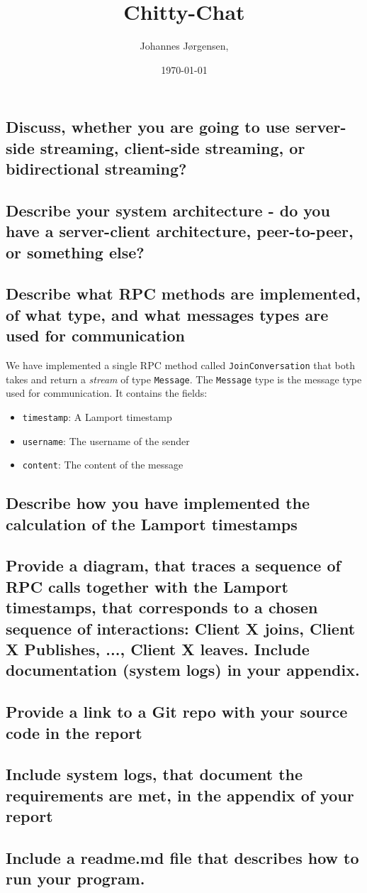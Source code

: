\documentclass[a4paper,11pt]{article}
\title{Chitty-Chat}
\author{Johannes Jørgensen,}
\date{\today}
\begin{document}
 

\maketitle

\subsection*{Discuss, whether you are going to use server-side streaming, client-side streaming, or bidirectional streaming?}

\subsection*{Describe your system architecture - do you have a server-client architecture, peer-to-peer, or something else?}
\subsection*{Describe what  RPC methods are implemented, of what type, and what messages types are used for communication}
We have implemented a single RPC method called \verb|JoinConversation| that both takes and return a \textit{stream} of type \verb|Message|.
The \verb|Message| type is the message type used for communication. It contains the fields:
\begin{itemize}
    \item \verb|timestamp|: A Lamport timestamp
    \item \verb|username|: The username of the sender
    \item \verb|content|: The content of the message
\end{itemize} 
\subsection*{Describe how you have implemented the calculation of the Lamport timestamps}
\subsection*{Provide a diagram, that traces a sequence of RPC calls together with the Lamport timestamps, that corresponds to a chosen sequence of interactions: Client X joins, Client X Publishes, ..., Client X leaves. Include documentation (system logs) in your appendix.}
\subsection*{Provide a link to a Git repo with your source code in the report}
\subsection*{Include system logs, that document the requirements are met, in the appendix of your report}
\subsection*{Include a readme.md file that describes how to run your program.}
\end{document}
